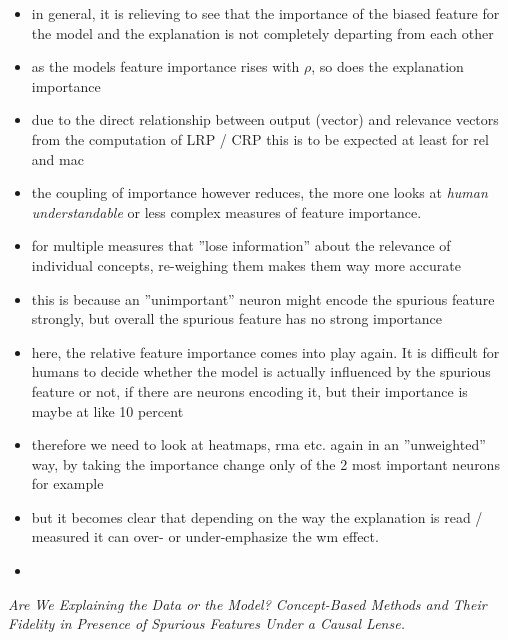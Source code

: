 \begin{itemize}
    \item in general, it is relieving to see that the importance of the biased feature for the model and the explanation is not completely departing from each other
    \item as the models feature importance rises with $\rho$, so does the explanation importance
    \item due to the direct relationship between output (vector) and relevance vectors from the computation of LRP / CRP this is to be expected at least for rel and mac
    \item the coupling of importance however reduces, the more one looks at \textit{human understandable} or less complex measures of feature importance. 
    \item for multiple measures that ''lose information'' about the relevance of individual concepts, re-weighing them makes them way more accurate
    \item this is because an ''unimportant'' neuron might encode the spurious feature strongly, but overall the spurious feature has no strong importance
    \item here, the relative feature importance comes into play again. It is difficult for humans to decide whether the model is actually influenced by the spurious feature or not, if there are neurons encoding it, but their importance is maybe at like 10 percent
    \item therefore we need to look at heatmaps, rma etc. again in an ''unweighted'' way, by taking the importance change only of the 2 most important neurons for example
    \item but it becomes clear that depending on the way the explanation is read / measured it can over- or under-emphasize the wm effect. 
    \item 
\end{itemize}

\textit{Are We Explaining the Data or the Model?
Concept-Based Methods and Their Fidelity in Presence of Spurious Features Under a Causal Lense.}

